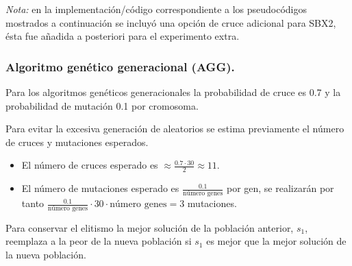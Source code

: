 \documentclass[11pt,a4paper]{article}
\theoremstyle{definition}
\begin{document}
	\textit{Nota:} en la implementación/código correspondiente a los pseudocódigos mostrados a continuación se incluyó una opción de cruce adicional para SBX2, ésta fue añadida a posteriori para el experimento extra.
	
	\subsubsection{Algoritmo genético generacional (AGG).}
	Para los algoritmos genéticos generacionales la probabilidad de cruce es 0.7 y la probabilidad de mutación 0.1 por cromosoma.
	
	Para evitar la excesiva generación de aleatorios se estima previamente el número de cruces y mutaciones esperados.
	
	\begin{itemize}
	\item El número de cruces esperado es $\approx \frac{0.7\cdot 30}{2}\approx 11$. 
	
	\item El número de mutaciones esperado es $\frac{0.1}{\text{número genes}}$ por gen, se realizarán por tanto $\frac{0.1}{\text{número genes}} \cdot 30 \cdot \text{número genes}=3$ mutaciones.
	\end{itemize}
	
	Para conservar el elitismo la mejor solución de la población anterior, $s_1$, reemplaza a la peor de la nueva población si $s_1$ es mejor que la mejor solución de la nueva población.\\
	
\end{document}
